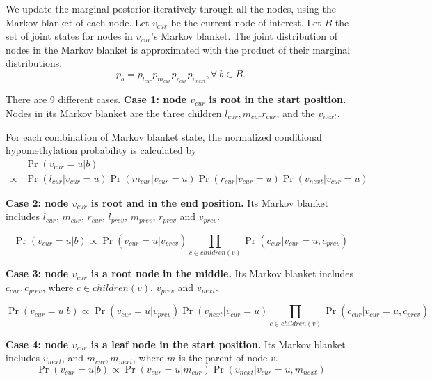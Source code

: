 \documentclass[11pt]{article}
\begin{document}
We update the marginal posterior iteratively through all the nodes,
using the Markov blanket of each node.
Let $v_{cur}$ be the current node of interest. Let $B$ the set of
joint states for nodes in $v_{cur}$'s Markov blanket. The joint
distribution of nodes in the Markov blanket is approximated with the
product of their marginal distributions.
$$p_{b} = p_{l_{cur}}p_{m_{cur}}p_{r_{cur}}p_{v_{next}}, \forall~b\in B.$$

There are 9 different cases.
\textbf{Case 1: node $v_{cur}$ is root in the start position.} Nodes
in its Markov blanket are the three children $l_{cur},m_{cur}
r_{cur}$, and the $v_{next}$.

For each combination of Markov blanket state, the normalized
conditional hypomethylation probability is calculated by
\begin{equation*}
\begin{aligned}
&\Pr(v_{cur} = u|b) \\
\propto & \Pr(l_{cur}| v_{cur} = u)\Pr(m_{cur}| v_{cur} = u)\Pr(r_{cur}| v_{cur} = u) \Pr(v_{next}| v_{cur} = u)
\end{aligned}
\end{equation*}

\textbf{Case 2: node $v_{cur}$ is root and in the end position.} Its
Markov blanket includes $l_{cur}$, $m_{cur}$, $r_{cur}$, $l_{prev}$,
$m_{prev}$, $r_{prev}$ and $v_{prev}$.

\begin{equation*}
\Pr(v_{cur} = u|b)
\propto \Pr(v_{cur} = u| v_{prev})\prod_{c \in children(v)}\Pr(c_{cur}| v_{cur} = u, c_{prev})
\end{equation*}


\textbf{Case 3: node $v_{cur}$ is a root node in the middle.}  Its
Markov blanket includes $c_{cur},c_{prev}$, where $c\in children(v)$,
$v_{prev}$ and $v_{next}$.

\begin{equation*}
\Pr(v_{cur} = u|b)
\propto \Pr(v_{cur} = u| v_{prev}) \Pr(v_{next}|v_{cur} = u)\prod_{c \in children(v)}\Pr(c_{cur}| v_{cur} = u, c_{prev})
\end{equation*}

\textbf{Case 4: node $v_{cur}$ is a leaf node in the start position.}
Its Markov blanket includes $v_{next}$, and $m_{cur}, m_{next}$, where
$m$ is the parent of node $v$.
\begin{equation*}
\Pr(v_{cur} = u|b)
\propto \Pr(v_{cur} = u| m_{cur}) \Pr(v_{next}|v_{cur} = u, m_{next})
\end{equation*}
\end{document}
